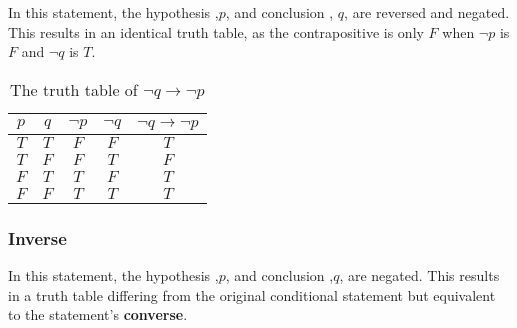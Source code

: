 \documentclass[12pt letter]{report}
\begin{document}

In this statement, the hypothesis ,$p$, and conclusion , $q$, are reversed and negated. This results in an identical
truth table, as the contrapositive is only $F$ when $\neg p$ is $F$ and $\neg q$ is $T$.


\begin{table}[h!]
	\caption{The truth table of $\neg q \to  \neg p$}\label{tab:6}
	\begin{center}
		\begin{tabular}{|c c|c c|c|}
			\hline
			$p$ & $q$ & $ \neg p $ & $\neg q$ & $\neg q \to  \neg p$ \\[0.5ex]
			\hline
			\hline
			$T$ & $T$ & $F$        & $F$      & $T$                  \\
			$T$ & $F$ & $F$        & $T$      & $F$                  \\
			$F$ & $T$ & $T$        & $F$      & $T$                  \\
			$F$ & $F$ & $T$        & $T$      & $T$                  \\
			\hline
		\end{tabular}
	\end{center}
\end{table}


\subsubsection{Inverse}


In this statement, the hypothesis ,$p$, and conclusion ,$q$, are negated. This results in a truth table differing from
the original conditional statement but equivalent to the statement's \textbf{converse}.

\end{document}
